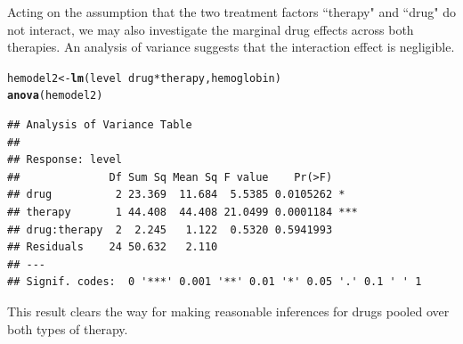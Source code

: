 \documentclass[a4paper]{article}\usepackage[]{graphicx}\usepackage[]{color}
\makeatletter
\newcommand{\hlopt}[1]{\textcolor[rgb]{0,0,0}{#1}}%
\newcommand{\hlstd}[1]{\textcolor[rgb]{0.345,0.345,0.345}{#1}}%
\newcommand{\hlkwb}[1]{\textcolor[rgb]{0.69,0.353,0.396}{#1}}%
\newcommand{\hlkwd}[1]{\textcolor[rgb]{0.737,0.353,0.396}{\textbf{#1}}}%
\newenvironment{kframe}{%
 \def\at@end@of@kframe{}%
 \ifinner\ifhmode%
  \def\at@end@of@kframe{\end{minipage}}%
  \begin{minipage}{\columnwidth}%
 \fi\fi%
 \def\FrameCommand##1{\hskip\@totalleftmargin \hskip-\fboxsep
 \colorbox{shadecolor}{##1}\hskip-\fboxsep
     \hskip-\linewidth \hskip-\@totalleftmargin \hskip\columnwidth}%
 \MakeFramed {\advance\hsize-\width
   \@totalleftmargin\z@ \linewidth\hsize
   \@setminipage}}%
 {\par\unskip\endMakeFramed%
 \at@end@of@kframe}
\newenvironment{knitrout}{}{} %
\makeatother
\begin{document}
Acting on the assumption that the two treatment factors ``therapy" and ``drug" do not interact, we may also investigate the marginal drug effects across both therapies. An analysis of variance suggests that the interaction effect is negligible.

\begin{knitrout}
\color{fgcolor}\begin{kframe}
\begin{alltt}
\hlstd{hemodel2} \hlkwb{<-} \hlkwd{lm}\hlstd{(level} \hlopt{~} \hlstd{drug} \hlopt{*} \hlstd{therapy, hemoglobin)}
\hlkwd{anova}\hlstd{(hemodel2)}
\end{alltt}
\begin{verbatim}
## Analysis of Variance Table
## 
## Response: level
##              Df Sum Sq Mean Sq F value    Pr(>F)    
## drug          2 23.369  11.684  5.5385 0.0105262 *  
## therapy       1 44.408  44.408 21.0499 0.0001184 ***
## drug:therapy  2  2.245   1.122  0.5320 0.5941993    
## Residuals    24 50.632   2.110                      
## ---
## Signif. codes:  0 '***' 0.001 '**' 0.01 '*' 0.05 '.' 0.1 ' ' 1
\end{verbatim}
\end{kframe}
\end{knitrout}

This result clears the way for making reasonable inferences for drugs pooled over both types of therapy.
\end{document}
